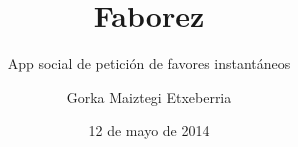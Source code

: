 \documentclass[spanish]{style/pfc}
\title{Faborez}
\subtitle{App social de petición de favores instantáneos}
\author{Gorka Maiztegi Etxeberria}
\date{12 de mayo de 2014}
\begin{document}
\maketitle



\cleardoublepage
\tableofcontents
\listoffigures
\listoftables
\listoflistings




%

%










\printglossaries


\end{document}
